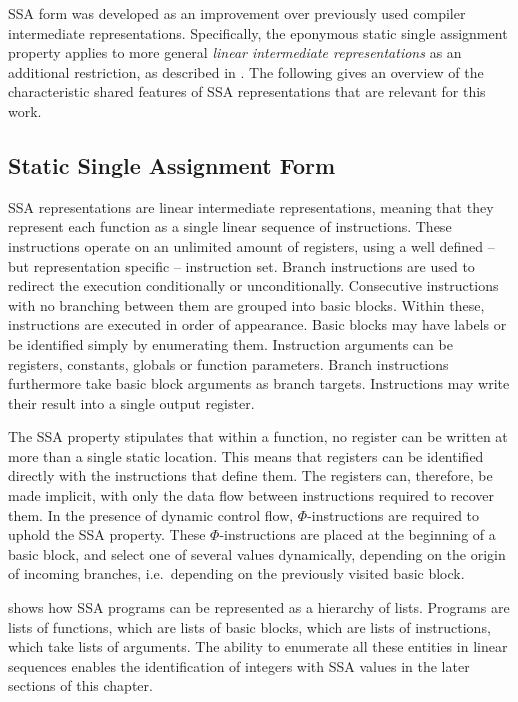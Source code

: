     SSA form was developed as an improvement over previously used
    compiler intermediate representations.
    Specifically, the eponymous static single assignment property applies to
    more general {\em linear intermediate representations} as an additional
    restriction, as described in \citet{Torczon:2007:EC:1526330}.
    The following  gives an overview of the characteristic shared
    features of SSA representations that are relevant for this work.

\subsection{Static Single Assignment Form}
\label{sec:ssaf}

    SSA representations are linear intermediate representations, meaning that
    they represent each function as a single linear sequence of instructions.
    These instructions operate on an unlimited amount of registers, using a well
    defined -- but representation specific -- instruction set.
    Branch instructions are used to redirect the execution conditionally or
    unconditionally.
    Consecutive instructions with no branching between them are grouped into
    basic blocks.
    Within these, instructions are executed in order of appearance.
    Basic blocks may have labels or be identified simply by enumerating them.
    Instruction arguments can be registers, constants, globals or function
    parameters.
    Branch instructions furthermore take basic block arguments as branch
    targets.
    Instructions may write their result into a single output register.

    The SSA property stipulates that within a function, no register can be
    written at more than a single static location.
    This means that registers can be identified directly with the instructions
    that define them.
    The registers can, therefore, be made implicit, with only the data flow
    between instructions required to recover them.
    In the presence of dynamic control flow, \mbox{$\Phi$-instructions} are
    required to uphold the SSA property.
    These \mbox{$\Phi$-instructions} are placed at the beginning of a basic
    block, and select one of several values dynamically, depending on the origin
    of incoming branches, i.e.\ depending on the previously visited
    basic block.

     shows how SSA programs can be represented as a
    hierarchy of lists.
    Programs are lists of functions, which are lists of basic blocks, which are
    lists of instructions, which take lists of arguments.
    The ability to enumerate all these entities in linear sequences enables the
    identification of integers with SSA values in the later sections of this
    chapter.

